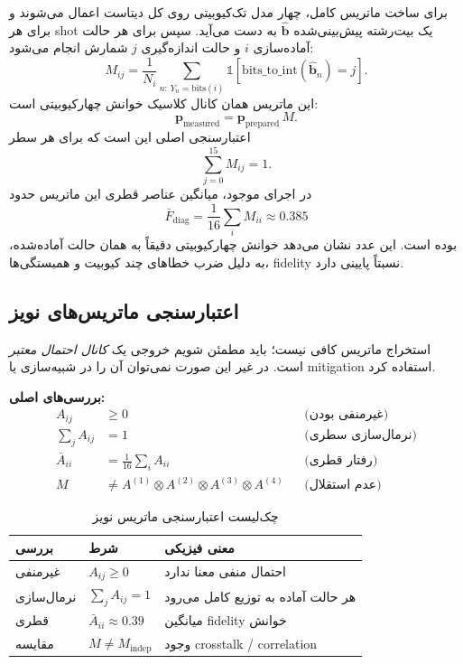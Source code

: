 برای ساخت ماتریس کامل، چهار مدل تک‌کیوبیتی روی کل دیتاست اعمال می‌شوند و برای هر shot یک بیت‌رشته پیش‌بینی‌شده $\hat{\mathbf{b}}$ به دست می‌آید. سپس برای هر حالت آماده‌سازی $i$ و حالت اندازه‌گیری $j$ شمارش انجام می‌شود:
\begin{equation}
	M_{ij}
	=
	\frac{1}{N_i}
	\sum_{n:\,Y_n=\mathrm{bits}(i)}
	\mathbb{1}\left[
	\mathrm{bits\_to\_int}(\hat{\mathbf{b}}_n)=j
	\right].
	\label{eq:full-matrix}
\end{equation}
این ماتریس همان کانال کلاسیک خوانش چهارکیوبیتی است:
\[
	\mathbf{p}_{\mathrm{measured}}
	=
	\mathbf{p}_{\mathrm{prepared}}\,M.
\]
اعتبارسنجی اصلی این است که برای هر سطر
\[
	\sum_{j=0}^{15} M_{ij}=1.
\]
در اجرای موجود، میانگین عناصر قطری این ماتریس حدود
\[
	\bar{F}_{\mathrm{diag}}=\frac{1}{16}\sum_i M_{ii}\approx0.385
\]
بوده است. این عدد نشان می‌دهد خوانش چهارکیوبیتی دقیقاً به همان حالت آماده‌شده، به دلیل ضرب خطاهای چند کیوبیت و همبستگی‌ها، fidelity نسبتاً پایینی دارد.

\subsection{اعتبارسنجی ماتریس‌های نویز}

استخراج ماتریس کافی نیست؛ باید مطمئن شویم خروجی یک \emph{کانال احتمال معتبر} است. در غیر این صورت نمی‌توان آن را در شبیه‌سازی یا mitigation استفاده کرد.

\textbf{بررسی‌های اصلی:}
\begin{align}
	A_{ij} &\ge 0 && \text{(غیرمنفی بودن)} \label{eq:val-nonneg}\\
	\sum_{j} A_{ij} &= 1 && \text{(نرمال‌سازی سطری)} \label{eq:val-row}\\
	\bar{A}_{ii} &= \frac{1}{16}\sum_i A_{ii} && \text{(رفتار قطری)} \label{eq:val-diag}\\
	M &\neq A^{(1)}\otimes A^{(2)}\otimes A^{(3)}\otimes A^{(4)} && \text{(عدم استقلال)} \label{eq:val-kron}
\end{align}

\begin{table}[htbp]
\centering
\caption{چک‌لیست اعتبارسنجی ماتریس نویز}
\label{tab:matrix-validation}
\begin{tabular}{lll}
\toprule
بررسی & شرط & معنی فیزیکی \\
\midrule
غیرمنفی & $A_{ij}\ge0$ & احتمال منفی معنا ندارد \\
نرمال‌سازی & $\sum_j A_{ij}=1$ & هر حالت آماده به توزیع کامل می‌رود \\
قطری & $\bar{A}_{ii}\approx0.39$ & میانگین fidelity خوانش \\
مقایسه & $M\neq M_{\mathrm{indep}}$ & وجود crosstalk / correlation \\
\bottomrule
\end{tabular}
\end{table}

